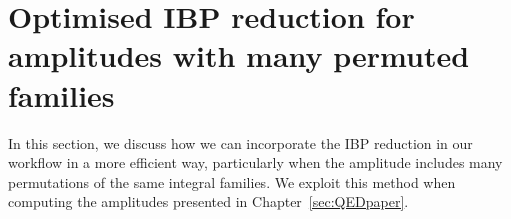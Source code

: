 \documentclass[main.tex]{subfiles}
\begin{document}
\renewcommand{\theequation}{A.\arabic{equation}}

\chapter{Optimised IBP reduction for amplitudes with many permuted families} \label{app:altIBPs}
In this section, we discuss how we can incorporate the IBP reduction in our workflow in a more efficient way, particularly when the amplitude includes many permutations of the same integral families. We exploit this method when computing the amplitudes presented in Chapter~\ref{sec:QEDpaper}.
\end{document}
